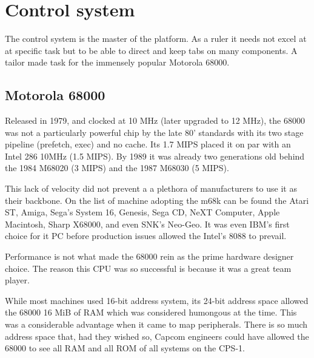 
\section{Control system}
The control system is the master of the platform. As a ruler it needs not excel at at specific task but to be able to direct and keep tabs on many components. A tailor made task for the immensely popular Motorola 68000.


\subsection{Motorola 68000}

 Released in 1979, and clocked at 10 MHz (later upgraded to 12 MHz), the 68000 was not a particularly powerful chip by the late 80' standards with its two stage pipeline\cite{M68000fv} (prefetch, exec) and no cache. Its 1.7 MIPS placed it on par with an Intel 286 10MHz (1.5 MIPS). By 1989 it was already two generations old behind the 1984 M68020 (3 MIPS) and the 1987 M68030 (5 MIPS)\cite{mips}.


This lack of velocity did not prevent a a plethora of manufacturers to use it as their backbone. On the list of machine adopting the m68k can be found the Atari ST, Amiga, Sega's System 16, Genesis, Sega CD, NeXT Computer, Apple Macintosh, Sharp X68000, and even SNK's Neo-Geo. It was even IBM's first choice for it PC before production issues allowed the Intel's 8088 to prevail\cite{ieee20170630}. 

Performance is not what made the 68000 rein as the prime hardware designer choice. The reason this CPU was so successful is because it was a great team player.

While most machines used 16-bit address system, its 24-bit address space allowed the 68000 16 MiB of RAM which was considered humongous at the time. This was a considerable advantage when it came to map peripherals. There is so much address space that, had they wished so, Capcom engineers could have allowed the 68000 to see all RAM and all ROM of all systems on the CPS-1.

